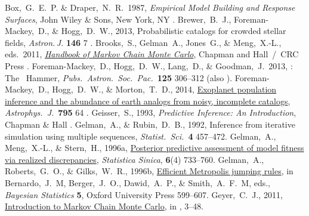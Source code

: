 \documentclass[12pt,twoside,pdftex]{article}
\newcommand{\MCMC}{\acronym{MCMC}}
\begin{document}
\clearpage
\raggedright
\begin{thebibliography}{}
  Box,~G.~E.~P. \& Draper,~N.~R.\ 1987,
  \textit{Empirical Model Building and Response Surfaces},
  John Wiley \& Sons, New York, NY
  .
  Brewer,~B.~J., Foreman-Mackey,~D., \& Hogg,~D.~W., 2013,
  {Probabilistic catalogs for crowded stellar fields},
  \textit{Astron.\,J.} \textbf{146} 7
  .
  Brooks,~S., Gelman~A., Jones~G., \& Meng,~X.-L., eds.\ 2011,
  \href{http://www.mcmchandbook.net/HandbookTableofContents.html}{\textit{Handbook of Markov Chain Monte Carlo}},
  Chapman and Hall~/~CRC Press
  .
  Foreman-Mackey,~D., Hogg,~D.~W., Lang,~D., \& Goodman,~J.\ 2013,
  : The \MCMC\ Hammer,
  \textit{Pubs.\ Astron.\ Soc.\ Pac.}\ \textbf{125} 306--312
  (also ).
  Foreman-Mackey,~D., Hogg,~D.~W., \& Morton,~T.~D., 2014,
  \href{http://adsabs.harvard.edu/abs/2014ApJ...795...64F}{Exoplanet population
    inference and the abundance of earth analogs from noisy, incomplete catalogs},
  \textit{Astrophys.\ J.}\ \textbf{795} 64
  .
  Geisser,~S., 1993,
  \textit{Predictive Inference: An Introduction},
  Chapman \& Hall
  .
  Gelman,~A., \& Rubin,~D.~B., 1992,
  Inference from iterative simulation using multiple sequences,
  \textit{Statist.\ Sci.}\ \textbf{4} 457--472.
  Gelman,~A., Meng,~X.-L., \& Stern,~H., 1996a,
  \href{http://www.jstor.org/stable/24306036}{Posterior predictive assessment of model fitness via realized discrepancies},
  \textit{Statistica Sinica}, \textbf{6}(4) 733--760.
  Gelman,~A., Roberts,~G.~O., \& Gilks,~W.~R., 1996b,
  \href{http://www.stat.columbia.edu/~gelman/research/published/baystat5.pdf}{Efficient Metropolis jumping rules},
  in Bernardo,~J.~M, Berger,~J.~O., Dawid,~A.~P., \& Smith,~A.~F.~M, eds.,
  \textit{Bayesian Statistics} \textbf{5}, Oxford University Press
  599--607.
  Geyer,~C.~J., 2011,
  \href{http://www.mcmchandbook.net/HandbookChapter1.pdf}{Introduction to Markov Chain Monte Carlo},
  in \citet{mcmchandbook}, 3--48.

\end{thebibliography}
\end{document}

